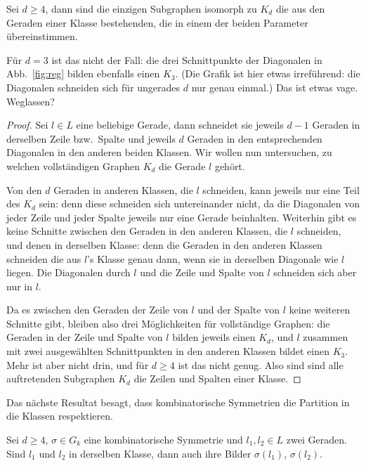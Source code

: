 \begin{lemma}
Sei $d \geq 4$, dann sind die einzigen Subgraphen isomorph zu $K_d$ die aus den Geraden einer Klasse bestehenden, die in einem der beiden Parameter übereinstimmen.
\end{lemma}
\begin{remarks}
Für $d=3$ ist das nicht der Fall: die drei Schnittpunkte der Diagonalen in Abb.~\ref{fig:reg} bilden ebenfalls einen $K_3$. (Die Grafik ist hier etwas irreführend: die Diagonalen schneiden sich für ungerades $d$ nur genau einmal.) \note Das ist etwas vage. Weglassen?
\end{remarks}
\begin{proof}
Sei $l \in L$ eine beliebige Gerade, dann schneidet sie jeweils $d-1$ Geraden in derselben Zeile bzw.~Spalte und jeweils $d$ Geraden in den entsprechenden Diagonalen in den anderen beiden Klassen. Wir wollen nun untersuchen, zu welchen vollständigen Graphen $K_d$ die Gerade $l$ gehört.

Von den $d$ Geraden in anderen Klassen, die $l$ schneiden, kann jeweils nur eine Teil des $K_d$ sein: denn diese schneiden sich untereinander nicht, da die Diagonalen von jeder Zeile und jeder Spalte jeweils nur eine Gerade beinhalten. Weiterhin gibt es keine Schnitte zwischen den Geraden in den anderen Klassen, die $l$ schneiden, und denen in derselben Klasse: denn die Geraden in den anderen Klassen schneiden die aus $l$'s Klasse genau dann, wenn sie in derselben Diagonale wie $l$ liegen. Die Diagonalen durch $l$ und die Zeile und Spalte von $l$ schneiden sich aber nur in $l$.

Da es zwischen den Geraden der Zeile von $l$ und der Spalte von $l$ keine weiteren Schnitte gibt, bleiben also drei Möglichkeiten für vollständige Graphen: die Geraden in der Zeile und Spalte von $l$ bilden jeweils einen $K_d$, und $l$ zusammen mit zwei ausgewählten Schnittpunkten in den anderen Klassen bildet einen $K_3$. Mehr ist aber nicht drin, und für $d \geq 4$ ist das nicht genug. Also sind sind alle auftretenden Subgraphen $K_d$ die Zeilen und Spalten einer Klasse.
\end{proof}
Das nächste Resultat besagt, dass kombinatorische Symmetrien die Partition in die Klassen respektieren.
\begin{lemma}
Sei $d \geq 4$, $\sigma \in G_k$ eine kombinatorische Symmetrie und $l_1, l_2 \in L$ zwei Geraden. Sind $l_1$ und $l_2$ in derselben Klasse, dann auch ihre Bilder $\sigma(l_1)$, $\sigma(l_2)$.
\end{lemma}
